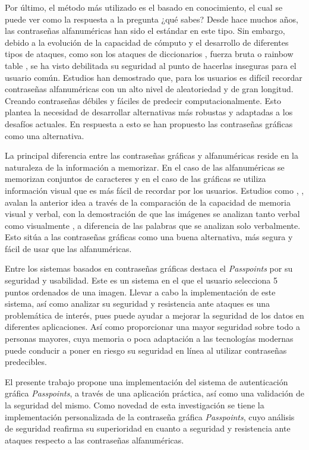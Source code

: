 Por último, el método más utilizado es el basado en conocimiento, el cual se puede ver como la respuesta a la pregunta ¿qué sabes? Desde hace muchos años, las contraseñas alfanuméricas han sido el estándar en este tipo. Sin embargo, debido a la evolución de la capacidad de cómputo y el desarrollo de diferentes tipos de ataques, como son los ataques de diccionarios  \cite{10.1145/1102120.1102168}, fuerza bruta  \cite{Apostol2012BruteforceA} o rainbow table  \cite{wahab2024investigating}, se ha visto debilitada su seguridad al punto de hacerlas inseguras para el usuario común. Estudios han demostrado que, para los usuarios es difícil recordar contraseñas alfanuméricas con un alto nivel de aleatoriedad y de gran longitud. Creando contraseñas débiles y fáciles de predecir computacionalmente. Esto plantea la necesidad de desarrollar alternativas más robustas y adaptadas a los desafíos actuales. En respuesta a esto se han propuesto las contraseñas gráficas como una alternativa.

La principal diferencia entre las contraseñas gráficas y alfanuméricas reside en la naturaleza de la información a memorizar. En el caso de las alfanuméricas se memorizan conjuntos de caracteres y en el caso de las gráficas se utiliza información visual que es más fácil de recordar por los usuarios. Estudios como  \cite{paivio2013imagery},  \cite{shepard1967recognition},  \cite{nelson1976pictorial} avalan la anterior idea a través de la comparación de la capacidad de memoria visual y verbal, con la demostración de que las imágenes se analizan tanto verbal como visualmente  \cite{shepard1967recognition}, a diferencia de las palabras que se analizan solo verbalmente. Esto sitúa a las contraseñas gráficas como una buena alternativa, más segura y fácil de usar que las alfanuméricas.

Entre los sistemas basados en contraseñas gráficas destaca el \textit{Passpoints}  \cite{wiedenbeck2005passpoints} por su seguridad y usabilidad. Este es un sistema en el que el usuario selecciona 5 puntos ordenados de una imagen. Llevar a cabo la implementación de este sistema, así como analizar su seguridad y resistencia ante ataques es una problemática de interés, pues puede ayudar a mejorar la seguridad de los datos en diferentes aplicaciones. Así como proporcionar una mayor seguridad sobre todo a personas mayores, cuya memoria o poca adaptación a las tecnologías modernas puede conducir a poner en riesgo su seguridad en línea al utilizar contraseñas predecibles.

El presente trabajo propone una implementación del sistema de autenticación gráfica \textit{Passpoints}, a través de una aplicación práctica, así como una validación de la seguridad del mismo. Como novedad de esta investigación se tiene la implementación personalizada de la contraseña gráfica \textit{Passpoints}, cuyo análisis de seguridad reafirma su superioridad en cuanto a seguridad y resistencia ante ataques respecto a las contraseñas alfanuméricas.



